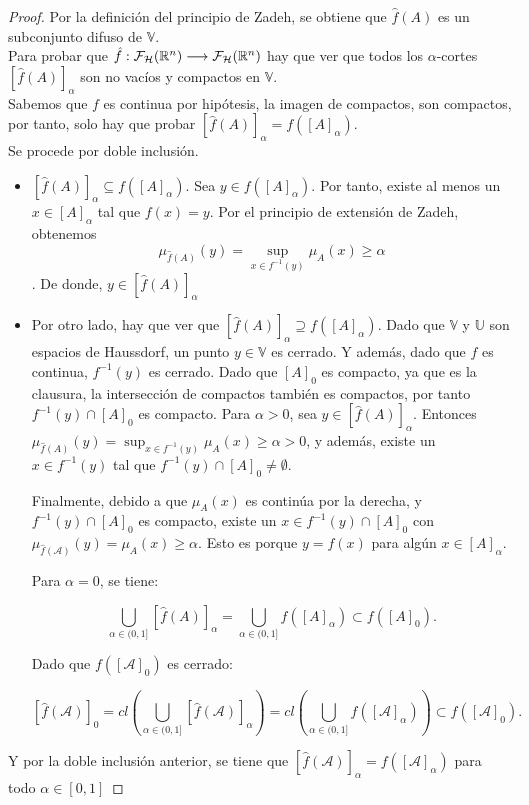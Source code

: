   \begin{proof}
    Por la definición del principio de Zadeh, se obtiene que $\hat{f}(A)$ es un subconjunto difuso de $\mathbb{V}$. \\
    Para probar que $\hat{f} : \mathcal{F}_\mathcal{H}(\mathbb R^n) \longrightarrow \mathcal{F}_\mathcal{H}(\mathbb R^n)$ hay que ver que todos los $\alpha$-cortes $[\hat{f}(A)]_\alpha$ son no vacíos y compactos en $\mathbb{V}$. \\
    Sabemos que $f$ es continua por hipótesis, la imagen de compactos, son compactos, por tanto, solo hay que probar $[\hat{f}(A)]_\alpha = f([A]_\alpha)$. \\
    Se procede por doble inclusión.
    
    \begin{itemize}
    \item $[\hat{f}(A)]_\alpha \subseteq f([A]_\alpha)$. Sea $y \in f([A]_\alpha)$. Por tanto, existe al menos un $x \in [A]_\alpha$ tal que $f(x)=y$. Por el principio de extensión de Zadeh, obtenemos $$\mu_{\hat{f}(A)}(y)=\sup_{x\in f^{-1}(y)} \mu_A(x) \geq \alpha$$. De donde, $y \in [\hat{f}(A)]_\alpha$
    \item Por otro lado, hay que ver que $[\hat{f}(A)]_\alpha \supseteq f([A]_\alpha)$. Dado que $\mathbb{V}$ y $\mathbb{U}$ son espacios de Haussdorf, un punto $y \in \mathbb{V}$ es cerrado. Y además, dado que $f$ es continua, $f^{-1}(y)$ es cerrado. Dado que $[A]_0$ es compacto, ya que es la clausura, la intersección de compactos también es compactos, por tanto $f^{-1}(y) \cap [A]_0$ es compacto. Para $\alpha>0$, sea $y \in [\hat{f}(A)]_\alpha$. Entonces $\mu_{\hat{f}(A)}(y)=\sup_{x\in f^{-1}(y)} \mu_A(x) \geq \alpha>0$, y además, existe un $x\in f^{-1}(y)$ tal que $f^{-1}(y) \cap [A]_0 \neq \emptyset$.
    
    Finalmente, debido a que $\mu_A(x)$ es continúa por la derecha, y $f^{-1}(y) \cap [A]_0$ es compacto, existe un $x \in f^{-1}(y) \cap [A]_0$ con $\mu_{\hat{f}(\mathcal{A})}(y)=\mu_{A}(x) \geq \alpha$. Esto es porque $y=f(x)$ para algún $x \in [A]_\alpha$.
    
    Para $\alpha=0$, se tiene:
    
    $$
    \bigcup_{\alpha \in (0, 1]} [\hat{f}(A)]_\alpha = \bigcup_{\alpha \in (0, 1]} f([A]_\alpha) \subset f([A]_0).
	$$
	
	Dado que $f([\mathcal{A}]_0)$ es cerrado:
	
	$$
	[\hat{f}(\mathcal{A})]_0 = cl\left( \bigcup_{\alpha \in (0, 1]} [\hat{f}(\mathcal{A})]_\alpha  \right) = cl\left(\bigcup_{\alpha \in (0, 1]} f([\mathcal{A}]_\alpha) \right)	\subset f([\mathcal{A}]_0).
	    $$
	     \end{itemize}
	    Y por la doble inclusión anterior, se tiene que $[\hat{f}(\mathcal{A})]_\alpha = f([\mathcal{A}]_\alpha)$ para todo $\alpha \in [0, 1]$
  \end{proof}


